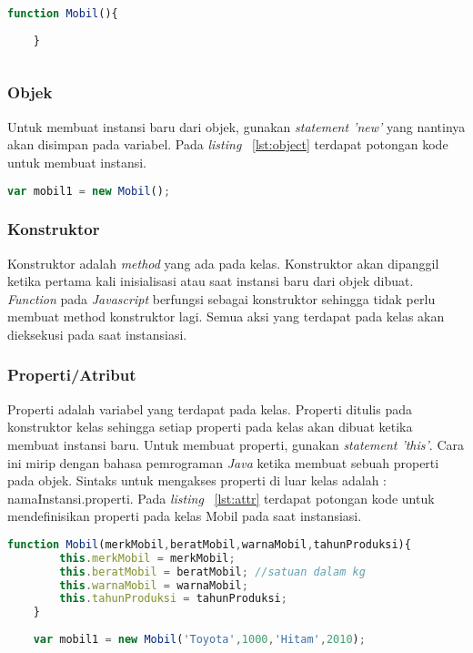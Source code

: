 \begin{lstlisting}[language=Javascript, caption=Membuat kelas Mobil, label={lst:class}]
	function Mobil(){
	
	}
	
\end{lstlisting}

\subsubsection{Objek}
Untuk membuat instansi baru dari objek, gunakan \textit{statement 'new'} yang nantinya akan disimpan pada variabel. Pada \textit{listing} ~\ref{lst:object} terdapat potongan kode untuk membuat instansi.

\begin{lstlisting}[language=Javascript, caption=Membuat \textit{instance} mobil, label={lst:object}]
	var mobil1 = new Mobil();
\end{lstlisting}

\subsubsection{Konstruktor}
Konstruktor adalah \textit{method} yang ada pada kelas. Konstruktor akan dipanggil ketika pertama kali inisialisasi atau saat instansi baru dari objek dibuat. \textit{Function} pada \textit{Javascript} berfungsi sebagai konstruktor sehingga tidak perlu membuat method konstruktor lagi. Semua aksi yang terdapat pada kelas akan dieksekusi pada saat instansiasi.

\subsubsection{Properti/Atribut}
Properti adalah variabel yang terdapat pada kelas. Properti ditulis pada konstruktor kelas sehingga setiap properti pada kelas akan dibuat ketika membuat instansi baru. Untuk membuat properti, gunakan \textit{statement 'this'}. Cara ini mirip dengan bahasa pemrograman \textit{Java} ketika membuat sebuah properti pada objek. Sintaks untuk mengakses properti di luar kelas adalah : namaInstansi.properti. Pada \textit{listing} ~\ref{lst:attr} terdapat potongan kode untuk mendefinisikan properti pada kelas Mobil pada saat instansiasi.

\begin{lstlisting}[language=Javascript, caption=Mendefinisikan properti pada kelas Mobil, label={lst:attr}]
	function Mobil(merkMobil,beratMobil,warnaMobil,tahunProduksi){
		this.merkMobil = merkMobil;
		this.beratMobil = beratMobil; //satuan dalam kg
		this.warnaMobil = warnaMobil;
		this.tahunProduksi = tahunProduksi;
	}
	
	var mobil1 = new Mobil('Toyota',1000,'Hitam',2010);
	
\end{lstlisting}

